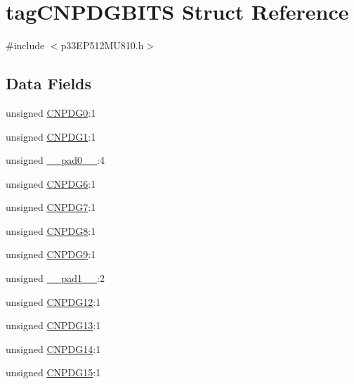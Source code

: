 \hypertarget{structtag_c_n_p_d_g_b_i_t_s}{}\section{tag\+C\+N\+P\+D\+G\+B\+I\+TS Struct Reference}
\label{structtag_c_n_p_d_g_b_i_t_s}


{\ttfamily \#include $<$p33\+E\+P512\+M\+U810.\+h$>$}

\subsection*{Data Fields}
\begin{DoxyCompactItemize}
\item 
unsigned \hyperlink{structtag_c_n_p_d_g_b_i_t_s_a91cca45c01a3b2de05d4ca4f94d99858}{C\+N\+P\+D\+G0}\+:1
\item 
unsigned \hyperlink{structtag_c_n_p_d_g_b_i_t_s_a9b51818c98c25cf83b80c2b301a6b5c2}{C\+N\+P\+D\+G1}\+:1
\item 
unsigned \hyperlink{structtag_c_n_p_d_g_b_i_t_s_adf71f3d8410c1f1dbbc96680a92c49af}{\+\_\+\+\_\+pad0\+\_\+\+\_\+}\+:4
\item 
unsigned \hyperlink{structtag_c_n_p_d_g_b_i_t_s_aaa85350c674196ef32869c231939f10b}{C\+N\+P\+D\+G6}\+:1
\item 
unsigned \hyperlink{structtag_c_n_p_d_g_b_i_t_s_a6b4ee0b4f4fe27f98582d3b7dabc2318}{C\+N\+P\+D\+G7}\+:1
\item 
unsigned \hyperlink{structtag_c_n_p_d_g_b_i_t_s_a741c5e7aca726568130f3c027ce8112a}{C\+N\+P\+D\+G8}\+:1
\item 
unsigned \hyperlink{structtag_c_n_p_d_g_b_i_t_s_a7af1bfd491d7a85b154412e07d6bd110}{C\+N\+P\+D\+G9}\+:1
\item 
unsigned \hyperlink{structtag_c_n_p_d_g_b_i_t_s_acaf2d0924a107ec6e8d2e31febaf66f9}{\+\_\+\+\_\+pad1\+\_\+\+\_\+}\+:2
\item 
unsigned \hyperlink{structtag_c_n_p_d_g_b_i_t_s_a53f5b6bcd2cda40f0039cefcd9440175}{C\+N\+P\+D\+G12}\+:1
\item 
unsigned \hyperlink{structtag_c_n_p_d_g_b_i_t_s_a2ea8bc757084887da092caa866181f1c}{C\+N\+P\+D\+G13}\+:1
\item 
unsigned \hyperlink{structtag_c_n_p_d_g_b_i_t_s_a3273ab5a9426d5d6a40c07d569ca70a3}{C\+N\+P\+D\+G14}\+:1
\item 
unsigned \hyperlink{structtag_c_n_p_d_g_b_i_t_s_a0aec10fa28ca5249cad647496791ede3}{C\+N\+P\+D\+G15}\+:1
\end{DoxyCompactItemize}


